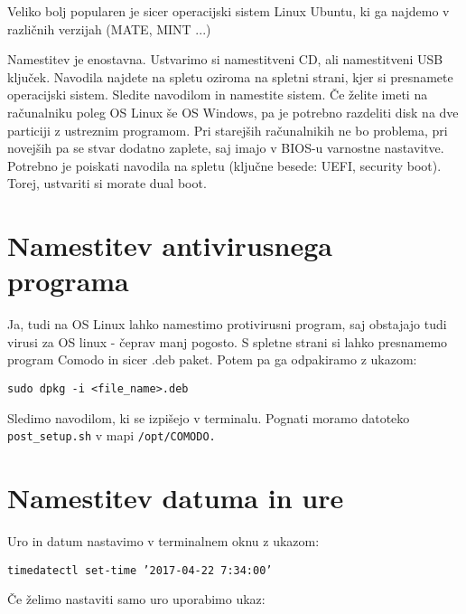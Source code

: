 \documentclass[12pt,a4paper,twoside]{article}
\begin{document}
Veliko bolj popularen je sicer operacijski sistem Linux Ubuntu, ki ga najdemo v različnih verzijah (MATE, MINT ...)

Namestitev je enostavna. Ustvarimo si namestitveni CD, ali namestitveni USB ključek. Navodila najdete na spletu oziroma na spletni strani, kjer si presnamete operacijski sistem. Sledite navodilom in namestite sistem. Če želite imeti na računalniku poleg OS Linux še OS Windows, pa je potrebno razdeliti disk na dve particiji z ustreznim programom. Pri starejših računalnikih ne bo problema, pri novejših pa se stvar dodatno zaplete, saj imajo v BIOS-u varnostne nastavitve. Potrebno je poiskati navodila na spletu (ključne besede: UEFI, security boot).  Torej, ustvariti si morate dual boot.


\section{Namestitev antivirusnega programa}
Ja, tudi na OS Linux lahko namestimo protivirusni program, saj obstajajo tudi virusi za OS linux - čeprav manj pogosto. S spletne strani si lahko presnamemo program Comodo in sicer .deb paket. Potem pa ga odpakiramo z ukazom:


 \texttt{sudo dpkg -i \textless file\_name\textgreater.deb}

Sledimo navodilom, ki se izpišejo v terminalu. Pognati moramo datoteko \texttt{post\_setup.sh} v mapi \texttt{/opt/COMODO.}



\section{Namestitev datuma in ure}
Uro in datum nastavimo v terminalnem oknu z ukazom:

\texttt{timedatectl set-time '2017-04-22 7:34:00'}

Če želimo nastaviti samo uro uporabimo ukaz:
\end{document}
